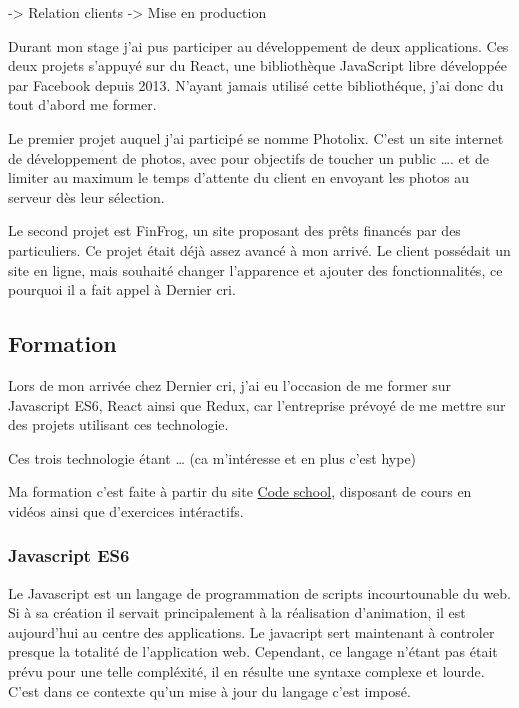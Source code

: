 \bigskip

-\textgreater{} Relation clients -\textgreater{} Mise en production

Durant mon stage j'ai pus participer au développement de deux
applications. Ces deux projets s'appuyé sur du React, une bibliothèque
JavaScript libre développée par Facebook depuis 2013. N'ayant jamais
utilisé cette bibliothéque, j'ai donc du tout d'abord me former.

\bigskip

Le premier projet auquel j'ai participé se nomme Photolix. C'est un site
internet de développement de photos, avec pour objectifs de toucher un
public \ldots{}. et de limiter au maximum le temps d'attente du client
en envoyant les photos au serveur dès leur sélection.

\bigskip

Le second projet est FinFrog, un site proposant des prêts financés par
des particuliers. Ce projet était déjà assez avancé à mon arrivé. Le
client possédait un site en ligne, mais souhaité changer l'apparence et
ajouter des fonctionnalités, ce pourquoi il a fait appel à Dernier cri.

\subsection{Formation}\label{formation}

\bigskip

Lors de mon arrivée chez Dernier cri, j'ai eu l'occasion de me former
sur Javascript ES6, React ainsi que Redux, car l'entreprise prévoyé de
me mettre sur des projets utilisant ces technologie.

\bigskip

Ces trois technologie étant \ldots{} (ca m'intéresse et en plus c'est
hype)

\bigskip

Ma formation c'est faite à partir du site
\href{https://www.codeschool.com/}{Code school}, disposant de cours en
vidéos ainsi que d'exercices intéractifs.

\bigskip

\subsubsection{Javascript ES6}\label{javascript-es6}

\bigskip

Le Javascript est un langage de programmation de scripts incourtounable
du web. Si à sa création il servait principalement à la réalisation
d'animation, il est aujourd'hui au centre des applications. Le javacript
sert maintenant à controler presque la totalité de l'application web.
Cependant, ce langage n'étant pas était prévu pour une telle compléxité,
il en résulte une syntaxe complexe et lourde. C'est dans ce contexte
qu'un mise à jour du langage c'est imposé.

